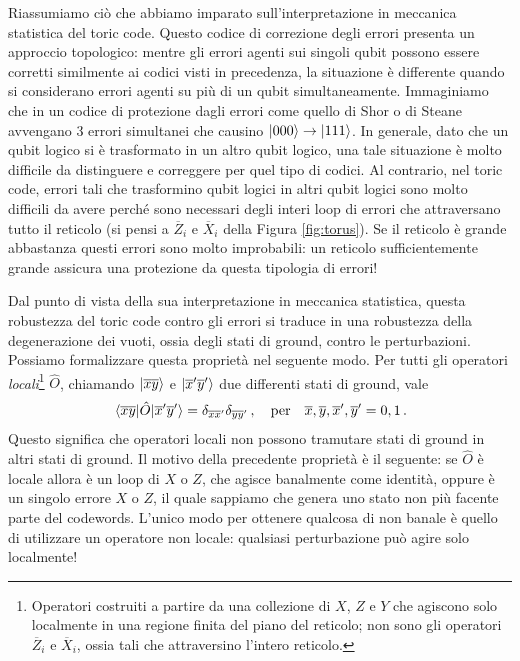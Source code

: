 \noindent Riassumiamo ciò che abbiamo imparato sull'interpretazione in meccanica statistica del toric code. Questo codice di correzione degli errori presenta un approccio topologico: mentre gli errori agenti sui singoli qubit possono essere corretti similmente ai codici visti in precedenza, la situazione è differente quando si considerano errori agenti su più di un qubit simultaneamente. Immaginiamo che in un codice di protezione dagli errori come quello di Shor o di Steane avvengano 3 errori simultanei che causino $\ket{000} \to \ket{111}$. In generale, dato che un qubit logico si è trasformato in un altro qubit logico, una tale situazione è molto difficile da distinguere e correggere per quel tipo di codici. Al contrario, nel toric code, errori tali che trasformino qubit logici in altri qubit logici sono molto difficili da avere perché sono necessari degli interi loop di errori che attraversano tutto il reticolo (si pensi a $\overline{Z}_i$ e $\overline{X}_i$ della Figura \ref{fig:torus}). Se il reticolo è grande abbastanza questi errori sono molto improbabili: un reticolo sufficientemente grande assicura una protezione da questa tipologia di errori!

\noindent Dal punto di vista della sua interpretazione in meccanica statistica, questa robustezza del toric code contro gli errori si traduce in una robustezza della degenerazione dei vuoti, ossia degli stati di ground, contro le perturbazioni. Possiamo formalizzare questa proprietà nel seguente modo. Per tutti gli operatori \textit{locali}\footnote{Operatori costruiti a partire da una collezione di $X$, $Z$ e $Y$ che agiscono solo localmente in una regione finita del piano del reticolo; non sono gli operatori $\overline{Z}_i$ e $\overline{X}_i$, ossia tali che attraversino l'intero reticolo.} $\hat{O}$, chiamando $\ket{\overline{x}\overline{y}}$ e $\ket{\overline{x}'\overline{y}'}$ due differenti stati di ground, vale
\begin{equation*}
    \mel{\overline{x}\overline{y}}{\hat{O}}{\overline{x}'\overline{y}'} = \delta_{\overline{x} \overline{x}'} \delta_{\overline{y} \overline{y}'} \, , \quad \text{per} \quad \overline{x}, \overline{y}, \overline{x}', \overline{y}' = 0,1 \, .
\end{equation*}
Questo significa che operatori locali non possono tramutare stati di ground in altri stati di ground. Il motivo della precedente proprietà è il seguente: se $\hat{O}$ è locale allora è un loop di $X$ o $Z$, che agisce banalmente come identità, oppure è un singolo errore $X$ o $Z$, il quale sappiamo che genera uno stato non più facente parte del codewords. L'unico modo per ottenere qualcosa di non banale è quello di utilizzare un operatore non locale: qualsiasi perturbazione può agire solo localmente!


